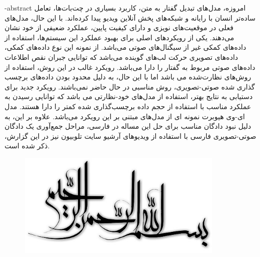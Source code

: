 \secondsupervisor{}

\fa-abstract{
	امروزه، مدل‌های تبدیل گفتار به متن، کاربرد بسیاری در چت‌بات‌ها، تعامل ساده‌تر انسان با رایانه و شبکه‌های پخش آنلاین ویدیو پیدا کرده‌اند. با این حال، مدل‌های فعلی در موقعیت‌های نویزی و دارای کیفیت پایین، عملکرد ضعیفی از خود نشان می‌دهند. یکی از رویکرد‌های اصلی برای بهبود عملکرد این سیستم‌ها، استفاده از داده‌های کمکی غیر از سیگنال‌های صوتی می‌باشد. از نمونه این نوع داده‌های کمکی، داده‌های تصویری حرکت لب‌های گوینده می‌باشد که توانایی جبران نقص اطلاعات داده‌های صوتی مربوط به گفتار را دارا می‌باشد. رویکرد غالب در این روش، استفاده از روش‌های نظارت‌شده
	می باشد اما با این حال، به دلیل محدود بودن داده‌های برچسب گذاری شده صوتی-تصویری، روش مناسبی در حال حاضر نمی‌باشند. رویکرد جدید برای دستیابی به نتایج بهتر، استفاده از مدل‌های خود-نظارتی
	می باشد که توانایی رسیدن به عملکرد مناسب با استفاده از حجم داده برچسب‌گذاری شده کمتر را دارا هستند. مدل ای-وی هیوبرت
	نمونه ای از مدل‌های مبتنی بر این رویکرد می‌باشد. علاوه بر این، به دلیل نبود دادگان مناسب برای حل این مساله در فارسی، مراحل جمع‌آوری یک دادگان صوتی-تصویری فارسی با استفاده از ویدیو‌های آرشیو سایت تلوبیون نیز در این گزارش، ذکر شده است.
}





\AUTtitle
\vspace*{7cm}
\thispagestyle{empty}
\begin{center}
\includegraphics[height=5cm,width=12cm]{besm}
\end{center}
\AUTtitle